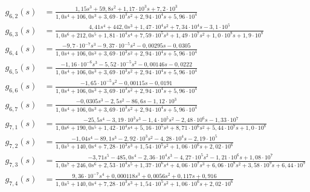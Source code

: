 \begin{landscape}
\begin{align}
    g_{6,2}(s) &= \frac{1{,}15 s^{3} + 59{,}8 s^{2} + 1{,}17 \cdot 10^{3} s + 7{,}2 \cdot 10^{3}}{1{,}0 s^{4} + 106{,}0 s^{3} + 3{,}69 \cdot 10^{3} s^{2} + 2{,}94 \cdot 10^{4} s + 5{,}96 \cdot 10^{4}} \\
    g_{6,3}(s) &= \frac{4{,}41 s^{4} + 442{,}0 s^{3} + 1{,}47 \cdot 10^{4} s^{2} + 7{,}34 \cdot 10^{4} s - 3{,}1 \cdot 10^{5}}{1{,}0 s^{6} + 212{,}0 s^{5} + 1{,}81 \cdot 10^{4} s^{4} + 7{,}59 \cdot 10^{5} s^{3} + 1{,}49 \cdot 10^{7} s^{2} + 1{,}0 \cdot 10^{8} s + 1{,}9 \cdot 10^{8}} \\
    g_{6,4}(s) &= \frac{- 9{,}7 \cdot 10^{-7} s^{3} - 9{,}37 \cdot 10^{-5} s^{2} - 0{,}00295 s - 0{,}0305}{1{,}0 s^{4} + 106{,}0 s^{3} + 3{,}69 \cdot 10^{3} s^{2} + 2{,}94 \cdot 10^{4} s + 5{,}96 \cdot 10^{4}} \\
    g_{6,5}(s) &= \frac{- 1{,}16 \cdot 10^{-6} s^{3} - 5{,}52 \cdot 10^{-5} s^{2} - 0{,}00146 s - 0{,}0222}{1{,}0 s^{4} + 106{,}0 s^{3} + 3{,}69 \cdot 10^{3} s^{2} + 2{,}94 \cdot 10^{4} s + 5{,}96 \cdot 10^{4}} \\
    g_{6,6}(s) &= \frac{- 1{,}65 \cdot 10^{-5} s^{2} - 0{,}00115 s - 0{,}0191}{1{,}0 s^{4} + 106{,}0 s^{3} + 3{,}69 \cdot 10^{3} s^{2} + 2{,}94 \cdot 10^{4} s + 5{,}96 \cdot 10^{4}} \\
    g_{6,7}(s) &= \frac{- 0{,}0305 s^{3} - 2{,}5 s^{2} - 86{,}6 s - 1{,}12 \cdot 10^{3}}{1{,}0 s^{4} + 106{,}0 s^{3} + 3{,}69 \cdot 10^{3} s^{2} + 2{,}94 \cdot 10^{4} s + 5{,}96 \cdot 10^{4}} \\
    g_{7,1}(s) &= \frac{- 25{,}5 s^{4} - 3{,}19 \cdot 10^{3} s^{3} - 1{,}4 \cdot 10^{5} s^{2} - 2{,}48 \cdot 10^{6} s - 1{,}33 \cdot 10^{7}}{1{,}0 s^{6} + 190{,}0 s^{5} + 1{,}42 \cdot 10^{4} s^{4} + 5{,}16 \cdot 10^{5} s^{3} + 8{,}71 \cdot 10^{6} s^{2} + 5{,}44 \cdot 10^{7} s + 1{,}0 \cdot 10^{8}} \\
    g_{7,2}(s) &= \frac{- 1{,}04 s^{4} - 89{,}1 s^{3} - 2{,}92 \cdot 10^{3} s^{2} - 4{,}28 \cdot 10^{4} s - 2{,}19 \cdot 10^{5}}{1{,}0 s^{5} + 140{,}0 s^{4} + 7{,}28 \cdot 10^{3} s^{3} + 1{,}54 \cdot 10^{5} s^{2} + 1{,}06 \cdot 10^{6} s + 2{,}02 \cdot 10^{6}} \\
    g_{7,3}(s) &= \frac{- 3{,}71 s^{5} - 485{,}0 s^{4} - 2{,}36 \cdot 10^{4} s^{3} - 4{,}27 \cdot 10^{5} s^{2} - 1{,}21 \cdot 10^{6} s + 1{,}08 \cdot 10^{7}}{1{,}0 s^{7} + 246{,}0 s^{6} + 2{,}53 \cdot 10^{4} s^{5} + 1{,}37 \cdot 10^{6} s^{4} + 4{,}06 \cdot 10^{7} s^{3} + 6{,}06 \cdot 10^{8} s^{2} + 3{,}58 \cdot 10^{9} s + 6{,}44 \cdot 10^{9}} \\
    g_{7,4}(s) &= \frac{9{,}36 \cdot 10^{-7} s^{4} + 0{,}000118 s^{3} + 0{,}0056 s^{2} + 0{,}117 s + 0{,}916}{1{,}0 s^{5} + 140{,}0 s^{4} + 7{,}28 \cdot 10^{3} s^{3} + 1{,}54 \cdot 10^{5} s^{2} + 1{,}06 \cdot 10^{6} s + 2{,}02 \cdot 10^{6}} \\

\end{align}
\end{landscape}
